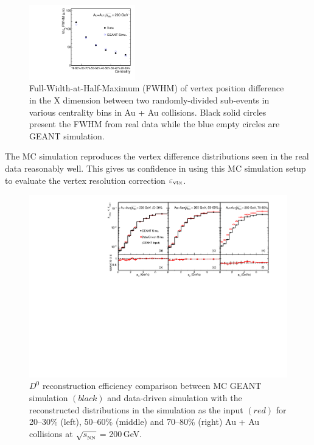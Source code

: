 \documentclass[%
 reprint,	
 amsmath,amssymb,
 aps,
 prc,
]{revtex4-1}
\begin{document}
\begin{figure}
\centering
\includegraphics[width=0.41\textwidth]{fig/vtxX_vsCent.pdf}
\caption{Full-Width-at-Half-Maximum (FWHM) of vertex position difference in the X dimension between two randomly-divided sub-events in various centrality bins in Au + Au collisions. Black solid circles present the FWHM from real data while the blue empty circles are GEANT simulation.}
\label{fig:vtxX_vsCent} 
\end{figure}

The MC simulation reproduces the vertex difference distributions seen in the real data reasonably well. This gives us confidence in using this MC simulation setup to evaluate the vertex resolution correction $\varepsilon_{\rm vtx}$.

\begin{figure}
\centering
\includegraphics[width=1.05\textwidth]{fig/Mcd0Eff_20_80.pdf}
\caption{$D^{0}$ reconstruction efficiency comparison between MC GEANT simulation $(black)$ and  data-driven simulation with the reconstructed distributions in the simulation as the input $(red)$ for 20--30\% (left), 50--60\% (middle) and 70--80\% (right) Au + Au collisions at $\sqrt{s_{_{\rm NN}}}$ = 200\,GeV.}
\label{fig:Mcd0Eff_20_80} 
\end{figure}
\end{document}
